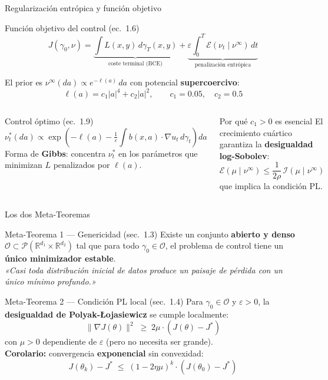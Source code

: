 \documentclass[10pt]{beamer}
\begin{document}
\begin{frame}{Regularización entrópica y función objetivo}

\begin{block}{Función objetivo del control (ec.\ 1.6)}
\[
  J(\gamma_0,\nu) = \underbrace{\int L(x,y)\,d\gamma_T(x,y)}_{\text{coste terminal (BCE)}} + \underbrace{\varepsilon\int_0^T \mathcal{E}(\nu_t\mid\nu^\infty)\,dt}_{\text{penalización entrópica}}
\]
\end{block}

\medskip
El prior es $\nu^\infty(da)\propto e^{-\ell(a)}\,da$ con potencial \textbf{supercoercivo}:
\[
  \ell(a) = c_1|a|^4 + c_2|a|^2, \qquad c_1 = 0.05,\quad c_2 = 0.5
\]

\begin{columns}
\begin{block}{Control óptimo (ec.\ 1.9)}
  \[
    \nu_t^*(da) \propto \exp\!\!\left(-\ell(a) - \tfrac{1}{\varepsilon}\int b(x,a)\cdot\nabla u_t\,d\gamma_t\right)da
  \]
  Forma de \textbf{Gibbs}: concentra $\nu_t^*$ en los parámetros que minimizan $L$ penalizados por $\ell(a)$.
\end{block}
\begin{block}{Por qué $c_1 > 0$ es esencial}
  El crecimiento cuártico garantiza la \textbf{desigualdad log-Sobolev}:
  \[
    \mathcal{E}(\mu\mid\nu^\infty) \leq \frac{1}{2\rho}\,\mathcal{I}(\mu\mid\nu^\infty)
  \]
  que implica la condición PL.
\end{block}
\end{columns}
\end{frame}

\begin{frame}{Los dos Meta-Teoremas}

\begin{block}{Meta-Teorema 1 — Genericidad (sec.\ 1.3)}
  Existe un conjunto \textbf{abierto y denso} $\mathcal{O}\subset\mathcal{P}(\mathbb{R}^{d_1}\times\mathbb{R}^{d_2})$ tal que para todo $\gamma_0\in\mathcal{O}$, el problema de control tiene un \textbf{único minimizador estable}.
  \medskip\\
  \textit{«Casi toda distribución inicial de datos produce un paisaje de pérdida con un único mínimo profundo.»}
\end{block}

\bigskip
\begin{block}{Meta-Teorema 2 — Condición PL local (sec.\ 1.4)}
  Para $\gamma_0\in\mathcal{O}$ y $\varepsilon > 0$, la \textbf{desigualdad de Polyak-Łojasiewicz} se cumple localmente:
  \[
    \|\nabla J(\theta)\|^2 \;\geq\; 2\mu\cdot(J(\theta)-J^*)
  \]
  con $\mu > 0$ dependiente de $\varepsilon$ (pero no necesita ser grande).\\[4pt]
  \textbf{Corolario:} convergencia \textbf{exponencial} sin convexidad:
  \[
    J(\theta_k) - J^* \;\leq\; (1-2\eta\mu)^k \cdot (J(\theta_0)-J^*)
  \]
\end{block}

\end{frame}
\end{document}
